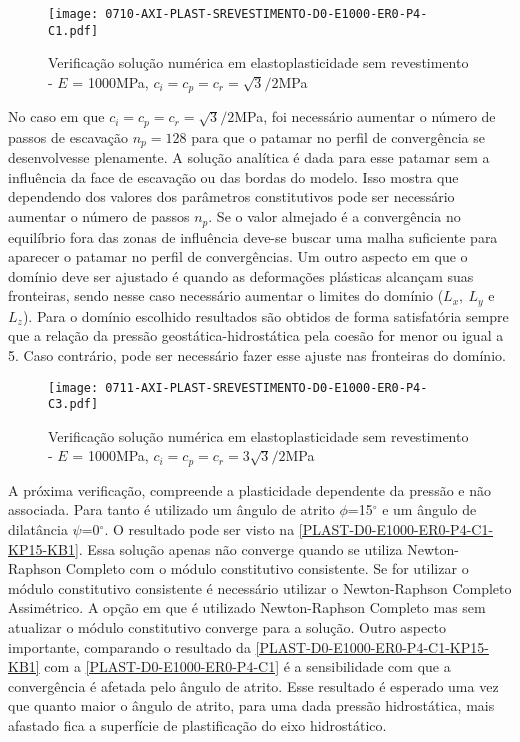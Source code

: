 \begin{figure}[H]
	\begin{center}
		\texttt{[image: 0710-AXI-PLAST-SREVESTIMENTO-D0-E1000-ER0-P4-C1.pdf]}
	\end{center}
	\caption{\label{PLAST-D0-E1000-ER0-P4-C1}Verificação solução numérica em elastoplasticidade sem revestimento - $E$ = 1000MPa,  $c_i=c_p=c_r = \sqrt{3}/2$MPa}
\end{figure}
No caso em que $c_i=c_p=c_r = \sqrt{3}/2$MPa, foi necessário aumentar o número de passos de escavação $n_p = 128$ para que o patamar no perfil de convergência se desenvolvesse plenamente. A solução analítica é dada para esse patamar sem a influência da face de escavação ou das bordas do modelo. Isso mostra que dependendo dos valores dos parâmetros constitutivos pode ser necessário aumentar o número de passos $n_p$. Se o valor almejado é a convergência no equilíbrio fora das zonas de influência deve-se buscar uma malha suficiente para aparecer o patamar no perfil de convergências. Um outro aspecto em que o domínio deve ser ajustado é quando as deformações plásticas alcançam suas fronteiras, sendo nesse caso necessário aumentar o limites do domínio ($L_x,~L_y$ e $L_z$). Para o domínio escolhido resultados são obtidos de forma satisfatória sempre que a relação da pressão geostática-hidrostática pela coesão for menor ou igual a 5. Caso contrário, pode ser necessário fazer esse ajuste nas fronteiras do domínio.
\begin{figure}[H]
	\begin{center}
		\texttt{[image: 0711-AXI-PLAST-SREVESTIMENTO-D0-E1000-ER0-P4-C3.pdf]}
	\end{center}
	\caption{\label{PLAST-D0-E1000-ER0-P4-C3}Verificação solução numérica em elastoplasticidade sem revestimento - $E$ = 1000MPa, $c_i=c_p=c_r = 3\sqrt{3}/2$MPa}
\end{figure}
 A próxima verificação, compreende a plasticidade dependente da pressão e não associada. Para tanto é utilizado um ângulo de atrito $\phi$=15$^\circ$ e um ângulo de dilatância $\psi$=0$^\circ$. O resultado pode ser visto na \autoref{PLAST-D0-E1000-ER0-P4-C1-KP15-KB1}. Essa solução apenas não converge quando se utiliza Newton-Raphson Completo com o módulo constitutivo consistente. Se for utilizar o módulo constitutivo consistente é necessário utilizar o Newton-Raphson Completo Assimétrico. A opção em que é utilizado Newton-Raphson Completo mas sem atualizar o módulo constitutivo converge para a solução. Outro aspecto importante, comparando o resultado da \autoref{PLAST-D0-E1000-ER0-P4-C1-KP15-KB1} com a \autoref{PLAST-D0-E1000-ER0-P4-C1} é a sensibilidade com que a convergência é afetada pelo ângulo de atrito. Esse resultado é esperado uma vez que quanto maior o ângulo de atrito, para uma dada pressão hidrostática, mais afastado fica a superfície de plastificação do eixo hidrostático.

